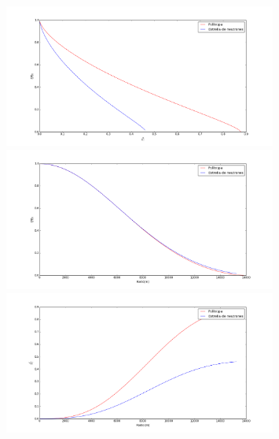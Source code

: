 \documentclass[11pt,a4paper]{article}
\begin{document}
\begin{figure}[!ht]
\begin{center}
\includegraphics[width=0.8\textwidth]{pf15_0.png}
\includegraphics[width=0.8\textwidth]{pf15_2.png}
\includegraphics[width=0.8\textwidth]{pf15_1.png}

\end{center}
\end{figure}
\end{document}
